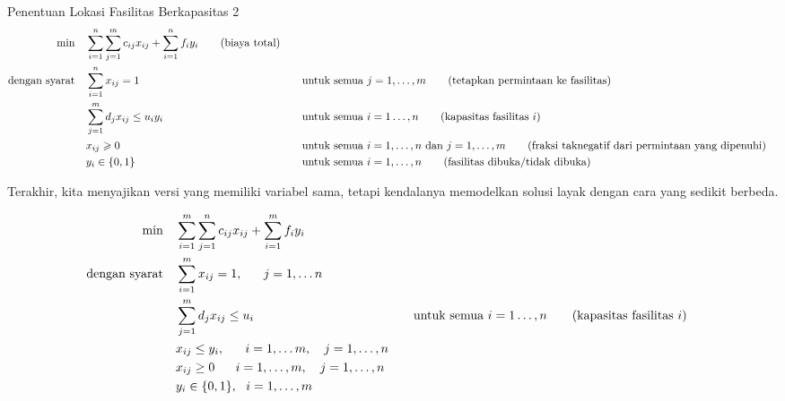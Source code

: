 \begin{general}{Penentuan Lokasi Fasilitas Berkapasitas 2}{\npcomplete}
\begin{align}
\min \quad & \displaystyle\sum_{i=1}^n\sum_{j=1}^mc_{ij}x_{ij}+\sum_{i=1}^nf_iy_i   \tag{biaya total} \\
\mbox{dengan syarat}\quad        & \displaystyle\sum_{i=1}^nx_{ij}=1 &&\quad \mbox{untuk semua } j=1,\dots,m   \tag{tetapkan permintaan ke fasilitas} \\
& \displaystyle \sum_{j=1}^md_jx_{ij}\leq u_iy_i &&\quad \mbox{untuk semua } i=1\dots,n   \tag{kapasitas fasilitas $i$} \\
& x_{ij}\geqslant0 &&\quad \mbox{untuk semua } i=1,\dots,n \mbox{ dan }j=1,\dots,m   \tag{fraksi taknegatif dari permintaan yang dipenuhi} \\
& y_i\in\{0,1\} &&\quad \mbox{untuk semua } i=1,\dots,n   \tag{fasilitas dibuka/tidak dibuka}
\end{align}

\end{general}

Terakhir, kita menyajikan versi yang memiliki variabel sama, tetapi kendalanya memodelkan solusi layak dengan cara yang sedikit berbeda.

\begin{align*}
\min \quad & \sum_{i = 1}^m\sum_{j=1}^n c_{ij}x_{ij}+\sum_{i = 1}^mf_iy_i \\
\mbox{dengan syarat}\quad        & \sum_{i = 1}^mx_{ij} = 1,~~~~~j =1,\ldots n \\
& \displaystyle \sum_{j=1}^md_jx_{ij}\leq u_i &&\quad \mbox{untuk semua } i=1\dots,n   \tag{kapasitas fasilitas $i$} \\
& x_{ij}\leq y_i,~~~~~ i = 1,\ldots m,~~~ j = 1,\ldots,n \\
& x_{ij} \geq 0~~~~~ i = 1,\ldots,m, ~~~j = 1,\ldots,n \\
& y_i\in \{0,1\}, \  \  i = 1,\ldots,m
\end{align*}
\fi  %

